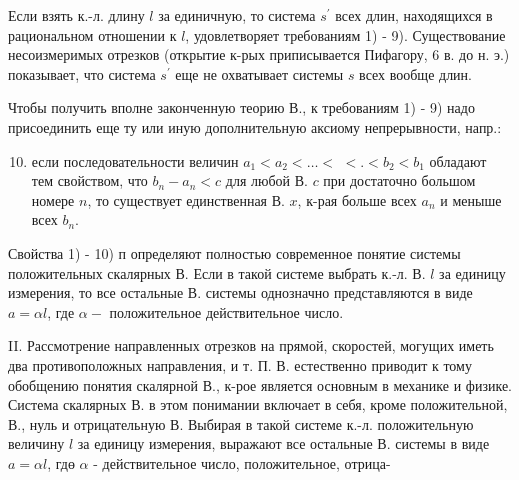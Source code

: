 \documentclass[10pt]{article}
\begin{document}
Если взять к.-л. длину $l$ за единичную, то система $s^{\prime}$ всех длин, находящихся в рациональном отношении к $l$, удовлетворяет требованиям 1) - 9). Существование несоизмеримых отрезков (открытие к-рых приписывается Пифагору, 6 в. до н. э.) показывает, что система $s^{\prime}$ еще не охватывает системы $s$ всех вообще длин.



Чтобы получить вполне законченную теорию В., к требованиям 1) - 9) надо присоединить еще ту или иную дополнительную аксиому непрерывности, напр.:



\begin{enumerate}

  \setcounter{enumi}{9}

  \item если последовательности величин $a_{1}<a_{2}<\ldots<$ $<.<b_{2}<b_{1}$ обладают тем свойством, что $b_{n}-a_{n}<c$ для любой В. $c$ при достаточно большом номере $n$, то существует единственная В. $x$, к-рая больше всех $a_{n}$ и меныше всех $b_{n}$.

\end{enumerate}



Свойства 1) - 10) п определяют полностью современное понятие системы положительных скалярных В. Если в такой системе выбрать к.-л. В. $l$ за единицу измерения, то все остальные В. системы однозначно представляются в виде $a=\alpha l$, где $\alpha-$ положительное действительное число.



II. Рассмотрение направленных отрезков на прямой, скоростей, могущих иметь два противоположных направления, и т. П. В. естественно приводит к тому обобщению понятия скалярной В., к-рое является основным в механике и физике. Система скалярных В. в этом понимании включает в себя, кроме положительной, В., нуль и отрицательную В. Выбирая в такой системе к.-л. положительную величину $l$ за единицу измерения, выражают все остальные В. системы в виде $a=\alpha l$, гдө $\alpha$ - действительное число, положительное, отрица-
\end{document}
